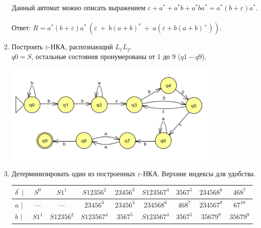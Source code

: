 \documentclass[fleqn,12pt, a4paper]{article}
\newcommand {\eps} {\varepsilon}
\begin{document}
\begin{enumerate}[label=(\roman{*})]
	
	\vspace{1em}
	
	Данный автомат можно описать выражением $\eps + a^* + a^*b + a^*ba^* = a^*(b+\eps)a^*$.\\\\
	Ответ: $R = a^*(b+\eps)a^*\ (\eps\ +\ b(a+b)^*\ +\ a (\eps + b(a+b)^+))$.
	
	\newpage
	
	\item Построить $\eps$-НКА, распознающий $L_1 L_2$. \\ $q0 = S$, остальные состояния пронумерованы от 1 до 9 ($q1 - q9$).
	
	\includegraphics[width=11cm]{task3_NF}
	
	
	\item Детерминизировать один из построенных $\eps$-НКА. Верхние индексы для удобства.
	
	\begin{tabular}{lcccccccc}
		\toprule
		\multicolumn{1}{c}{
			$\delta^\prime \mid$
		} 
		& \multicolumn{1}{c}{ $S^0$ }
		& \multicolumn{1}{c}{ $S1^1$ }
		& \multicolumn{1}{c}{ $S12356^2$ }
		& \multicolumn{1}{c}{ $23456^3$ }
		& \multicolumn{1}{c}{ $S123567^4$ }
		& \multicolumn{1}{c}{ $3567^5$ }
		& \multicolumn{1}{c}{ $234568^6$ }
		& \multicolumn{1}{c}{ $468^7$ }
		
		\\
		\midrule
		
		$a$ $\mid$ &
		--- & --- & $23456^3$ & $23456^3$ & $234568^6$ & $468^7$ & $234567^8$ &  $67^{10}$  \\
		$b$ $\mid$ &
		$S1^1$ & $S12356^2$ & $S123567^4$ & $3567^5$ & $S123567^4$ & $3567^5$ & $35679^9$ & $35679^9$ \\ 		
		\bottomrule
	\end{tabular}
	

\end{enumerate}
\end{document}
